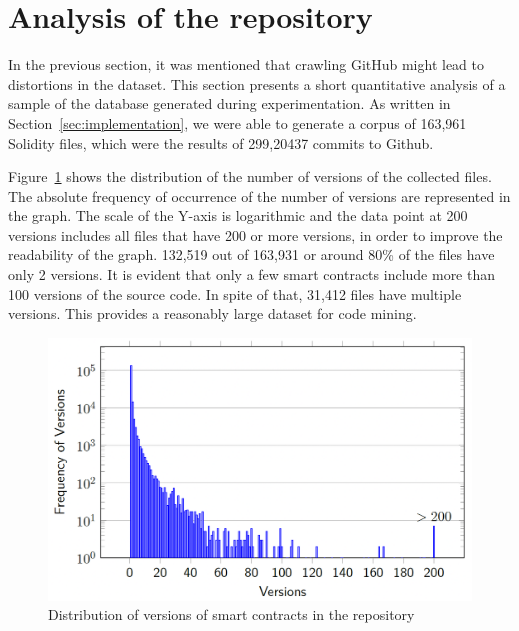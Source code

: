 \documentclass[10pt,conference]{IEEEtran}
\begin{document}
	\section{Analysis of the repository}
	In the previous section, it was mentioned that crawling GitHub might lead to distortions in the dataset. This section presents a short quantitative analysis of a sample of the database generated during experimentation. As written in Section~\ref{sec:implementation}, we were able to generate a corpus of 163,961 Solidity files, which were the results of 299,20437 commits to Github.
	
	Figure~\ref{fig:versions} shows the distribution of the number of versions of the collected files. The absolute frequency of occurrence of the number of versions are represented in the graph. The scale of the Y-axis is logarithmic and the data point at 200 versions includes all files that have 200 or more versions, in order to improve the readability of the graph. 132,519 out of 163,931 or around 80\% of the files have only 2 versions. It is evident that only a few smart contracts include more than 100 versions of the source code. In spite of that, 31,412 files have multiple versions. This provides a reasonably large dataset for code mining.
	
	\begin{figure}[!h]
		\centering
		\includegraphics[scale=0.3]{distr_versions_contracts.png}
		\caption{Distribution of versions of smart contracts in the repository}
		\label{fig:versions}
	\end{figure}
	
\end{document}

